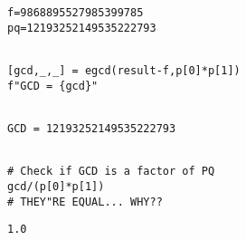 \documentclass[11pt]{article}
\begin{document}
\begin{verbatim}
f=9868895527985399785
pq=12193252149535222793
\end{verbatim}


\begin{verbatim}

[gcd,_,_] = egcd(result-f,p[0]*p[1])
f"GCD = {gcd}"


\end{verbatim}

\begin{verbatim}
GCD = 12193252149535222793
\end{verbatim}



\begin{verbatim}

# Check if GCD is a factor of PQ
gcd/(p[0]*p[1])
# THEY"RE EQUAL... WHY??

\end{verbatim}

\begin{verbatim}
1.0
\end{verbatim}
\end{document}
